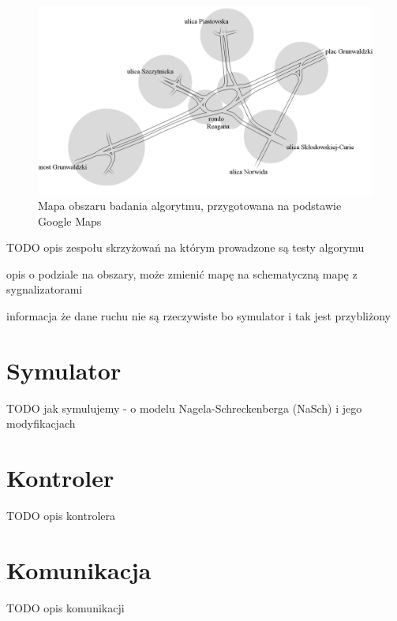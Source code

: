 \begin{figure}[h]
    \centering
    \includegraphics[width=1.0\textwidth]{images/mapa_czysta.png}
    \caption{Mapa obszaru badania algorytmu, przygotowana na podstawie Google Maps \cite{google_maps}}
    \label{fig:mapa_czysta}
\end{figure}


TODO opis zespołu skrzyżowań na którym prowadzone są testy algorymu

opis o podziale na obszary, może zmienić mapę na schematyczną mapę z sygnalizatorami

informacja że dane ruchu nie są rzeczywiste bo symulator i tak jest przybliżony

\section{Symulator}
\label{chap:symulacja}
TODO jak symulujemy - o modelu Nagela-Schreckenberga (NaSch) i jego modyfikacjach

\section{Kontroler}
\label{chap:kontroler}
TODO opis kontrolera

\section{Komunikacja}
\label{chap:komunikacja}
TODO opis komunikacji